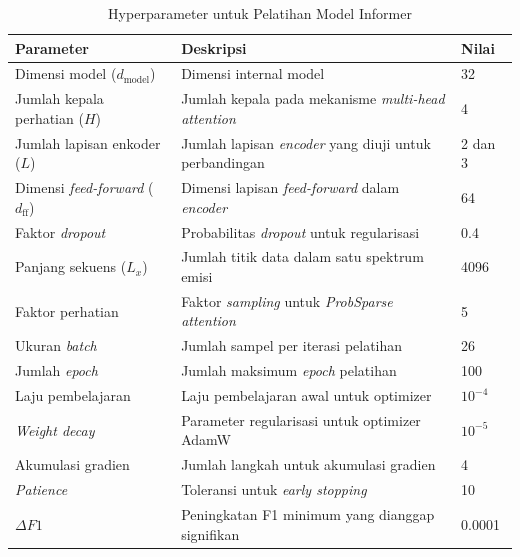 \begin{enumerate}
    \begin{table}[H]
      \centering
      \small
      \caption{Hyperparameter untuk Pelatihan Model Informer}
      \label{tab:hyperparameter_informer}
      \begin{tabular}{p{4cm} p{6cm} l}
        \toprule
        \textbf{Parameter} & \textbf{Deskripsi} & \textbf{Nilai} \\
        \midrule
        Dimensi model ($d_{\text{model}}$) & Dimensi internal model & 32 \\
        Jumlah kepala perhatian ($H$) & Jumlah kepala pada mekanisme \textit{multi-head attention} & 4 \\
        Jumlah lapisan enkoder ($L$) & Jumlah lapisan \textit{encoder} yang diuji untuk perbandingan & 2 dan 3 \\
        Dimensi \textit{feed-forward} ($d_{\text{ff}}$) & Dimensi lapisan \textit{feed-forward} dalam \textit{encoder} & 64 \\
        Faktor \textit{dropout} & Probabilitas \textit{dropout} untuk regularisasi & 0.4 \\
        Panjang sekuens ($L_x$) & Jumlah titik data dalam satu spektrum emisi & 4096 \\
        Faktor perhatian & Faktor \textit{sampling} untuk \textit{ProbSparse attention} & 5 \\
        Ukuran \textit{batch} & Jumlah sampel per iterasi pelatihan & 26 \\
        Jumlah \textit{epoch} & Jumlah maksimum \textit{epoch} pelatihan & 100 \\
        Laju pembelajaran & Laju pembelajaran awal untuk optimizer & $10^{-4}$ \\
        \textit{Weight decay} & Parameter regularisasi untuk optimizer AdamW & $10^{-5}$ \\
        Akumulasi gradien & Jumlah langkah untuk akumulasi gradien & 4 \\
        \textit{Patience} & Toleransi untuk \textit{early stopping} & 10 \\
        $\Delta F1$ & Peningkatan F1 minimum yang dianggap signifikan & 0.0001 \\
        \bottomrule
      \end{tabular}
    \end{table}


\end{enumerate}
